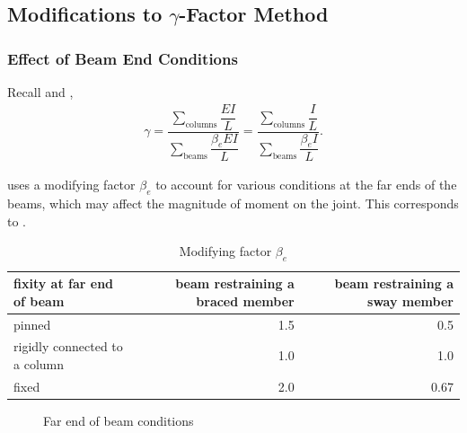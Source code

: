 %
%
%
\subsection{Modifications to \texorpdfstring{$\gamma$}{G}-Factor Method}
\subsubsection{Effect of Beam End Conditions}
Recall  and ,
\begin{gather*}
\gamma=\dfrac{\displaystyle\sum_{\text{columns}}\dfrac{EI}{L}}{\displaystyle\sum_{\text{beams}}\dfrac{\beta_eEI}{L}}=\dfrac{\displaystyle\sum_{\text{columns}}\dfrac{I}{L}}{\displaystyle\sum_{\text{beams}}\dfrac{\beta_eI}{L}}.
\end{gather*}

 uses a modifying factor $\beta_e$ to account for various conditions at the far ends of the beams, which may affect the magnitude of moment on the joint.
This corresponds to .
\begin{table}[H]
\centering\footnotesize
\caption{Modifying factor $\beta_e$}\label{tab:beta_e}
\begin{tabular}{lrr}
	\toprule
	fixity at far end of beam     & beam restraining a braced member & beam restraining a sway member \\ \midrule
	pinned                        &                              1.5 &                            0.5 \\
	rigidly connected to a column &                              1.0 &                            1.0 \\
	fixed                         &                              2.0 &                           0.67 \\ \bottomrule
\end{tabular}
\end{table}
\begin{figure}[H]
\centering

\caption{Far end of beam conditions}
\end{figure}
